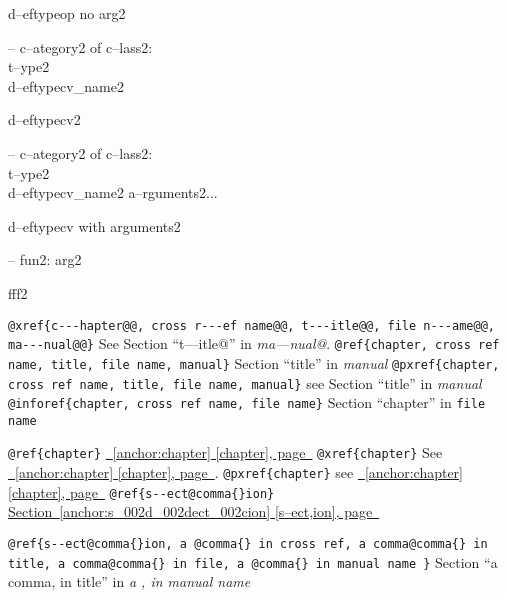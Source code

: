 \documentclass{book}
\begin{document}
\begin{titlepage}
%
d--eftypeop no arg2

\hbox{}-- c--ategory2 of c--lass2:\leavevmode{}\\t--ype2\leavevmode{}\\d--eftypecv\_name2


%
d--eftypecv2

\hbox{}-- c--ategory2 of c--lass2:\leavevmode{}\\t--ype2\leavevmode{}\\d--eftypecv\_name2 a--rguments2...


%
d--eftypecv with arguments2

\hbox{}-- fun2: arg2


%
fff2


\texttt{@xref\{c{-}{-}{-}hapter@@, cross r{-}{-}{-}ef name@@, t{-}{-}{-}itle@@, file n{-}{-}{-}ame@@, ma{-}{-}{-}nual@@\}} See Section ``t---itle@'' in \textit{ma---nual@}.
\texttt{@ref\{chapter, cross ref name, title, file name, manual\}} Section ``title'' in \textit{manual}
\texttt{@pxref\{chapter, cross ref name, title, file name, manual\}} see Section ``title'' in \textit{manual}
\texttt{@inforef\{chapter, cross ref name, file name\}} Section ``chapter'' in \texttt{file name}

\texttt{@ref\{chapter\}} \hyperref[anchor:chapter]{\chaptername~\ref*{anchor:chapter} [chapter], page~\pageref*{anchor:chapter}}
\texttt{@xref\{chapter\}} See \hyperref[anchor:chapter]{\chaptername~\ref*{anchor:chapter} [chapter], page~\pageref*{anchor:chapter}}.
\texttt{@pxref\{chapter\}} see \hyperref[anchor:chapter]{\chaptername~\ref*{anchor:chapter} [chapter], page~\pageref*{anchor:chapter}}
\texttt{@ref\{s{-}{-}ect@comma\{\}ion\}} \hyperref[anchor:s_002d_002dect_002cion]{Section~\ref*{anchor:s_002d_002dect_002cion} [s--ect,ion], page~\pageref*{anchor:s_002d_002dect_002cion}}

\texttt{@ref\{s{-}{-}ect@comma\{\}ion, a @comma\{\} in cross
ref, a comma@comma\{\} in title, a comma@comma\{\} in file, a @comma\{\} in manual name \}}
Section ``a comma, in title'' in \textit{a , in manual name}


\end{titlepage}
\end{document}
